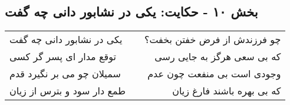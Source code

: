 \begin{center}
\section*{بخش ۱۰ - حکایت: یکی در نشابور دانی چه گفت}
\label{sec:010}
\begin{longtable}{l p{0.5cm} r}
یکی در نشابور دانی چه گفت
&&
چو فرزندش از فرض خفتن بخفت؟
\\
توقع مدار ای پسر گر کسی
&&
که بی سعی هرگز به جایی رسی
\\
سمیلان چو می بر نگیرد قدم
&&
وجودی است بی منفعت چون عدم
\\
طمع دار سود و بترس از زیان
&&
که بی بهره باشند فارغ زیان
\\
\end{longtable}
\end{center}
